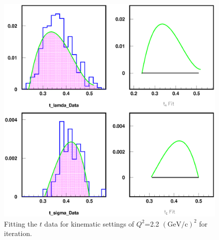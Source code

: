 \begin{figure}[!tbp]
  \centering
  \includegraphics[width=0.8\columnwidth]{fitfunction_kin2_3}
  \caption[Fitting $t$ for iteration.]{\label{fig:fitfunction_kin2_3}Fitting the $t$ data for kinematic settings of $Q^2$=2.2 $(\mathrm{GeV/c})^2$ for iteration.}
\end{figure}
